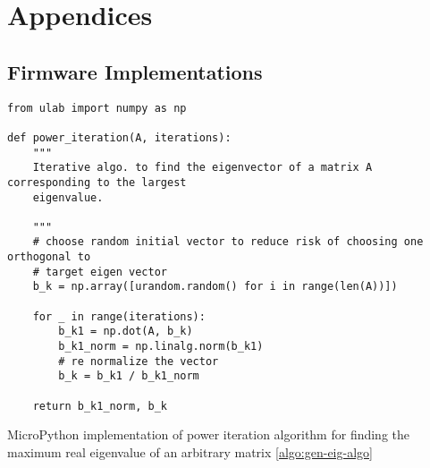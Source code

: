 \chapter{Appendices}
\label{chapter:appendices}

\graphicspath{ {report/Appendices/assets/} } 


\section{Firmware Implementations}
\label{app:firmware}

\begin{listing}[!htb]
\small
\begin{verbatim}
from ulab import numpy as np

def power_iteration(A, iterations):
    """
    Iterative algo. to find the eigenvector of a matrix A corresponding to the largest
    eigenvalue.
    
    """
    # choose random initial vector to reduce risk of choosing one orthogonal to 
    # target eigen vector
    b_k = np.array([urandom.random() for i in range(len(A))])

    for _ in range(iterations):
        b_k1 = np.dot(A, b_k)
        b_k1_norm = np.linalg.norm(b_k1)
        # re normalize the vector
        b_k = b_k1 / b_k1_norm

    return b_k1_norm, b_k

\end{verbatim}
\caption{MicroPython implementation of power iteration algorithm for finding the maximum real eigenvalue of an arbitrary matrix \ref{algo:gen-eig-algo}}
\label{app-listing:power-iteration-mpy}
\end{listing}

